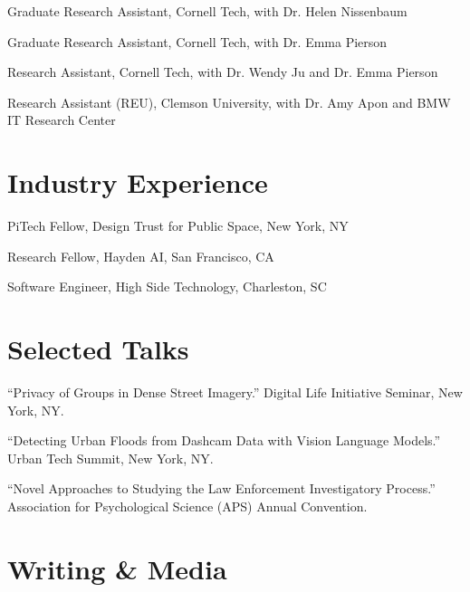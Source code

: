 \documentclass[10pt,letterpaper]{report}
\begin{document}
    \begin{tablist}
        \item[2026] \tab{}Graduate Research Assistant, Cornell Tech, with Dr. Helen Nissenbaum
        \item[2024] \tab{}Graduate Research Assistant, Cornell Tech, with Dr. Emma Pierson
        \item[2022--23] \tab{}Research Assistant, Cornell Tech, with Dr. Wendy Ju and Dr. Emma Pierson
        \item[2021] \tab{}Research Assistant (REU), Clemson University, with Dr. Amy Apon and BMW IT Research Center
    \end{tablist}

    \section*{Industry Experience}

    \begin{tablist}
        \item[2025] \tab{}PiTech Fellow, Design Trust for Public Space, New York, NY
        \item[2024--25] \tab{}Research Fellow, Hayden AI, San Francisco, CA
        \item[2021--22] \tab{}Software Engineer, High Side Technology, Charleston, SC
    \end{tablist}

    \section*{Selected Talks}

    \begin{tablist}
        \item[2025] \tab{}``Privacy of Groups in Dense Street Imagery.'' Digital Life Initiative Seminar, New York, NY.
        \item[2024] \tab{}``Detecting Urban Floods from Dashcam Data with Vision Language Models.'' Urban Tech Summit, New York, NY.
        \item[2024] \tab{}``Novel Approaches to Studying the Law Enforcement Investigatory Process.'' Association for Psychological Science (APS) Annual Convention.
    \end{tablist}

    \section*{Writing \& Media}
\end{document}
